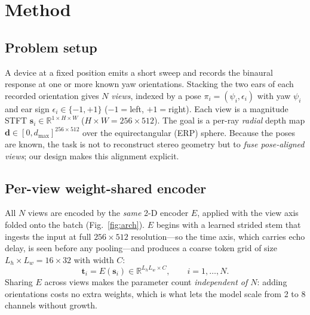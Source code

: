 \section{Method}
\label{sec:method}

\subsection{Problem setup}
A device at a fixed position emits a short sweep and records the binaural response at
one or more known yaw orientations. Stacking the two ears of each recorded
orientation gives $N$ \emph{views}, indexed by a pose
$\pi_i=(\psi_i,\epsilon_i)$ with yaw $\psi_i$ and ear sign $\epsilon_i\!\in\!\{-1,+1\}$
($-1{=}$left, $+1{=}$right). Each view is a magnitude STFT
$\mathbf{s}_i\!\in\!\mathbb{R}^{1\times H\times W}$ ($H{\times}W{=}256{\times}512$).
The goal is a per-ray \emph{radial} depth map
$\mathbf{d}\!\in\![0,d_{\max}]^{256\times512}$ over the equirectangular (ERP) sphere.
Because the poses are known, the task is not to reconstruct stereo geometry but to
\emph{fuse pose-aligned views}; our design makes this alignment explicit.

\subsection{Per-view weight-shared encoder}
All $N$ views are encoded by the \emph{same} 2-D encoder $E$, applied with the view
axis folded onto the batch (Fig.~\ref{fig:arch}). $E$ begins with a learned strided
stem that ingests the input at full $256\times512$ resolution---so the time axis,
which carries echo delay, is seen before any pooling---and produces a coarse token
grid of size $L_h\times L_w=16\times32$ with width $C$:
\begin{equation}
\mathbf{t}_i = E(\mathbf{s}_i)\in\mathbb{R}^{L_hL_w\times C},\qquad i=1,\dots,N .
\end{equation}
Sharing $E$ across views makes the parameter count \emph{independent of $N$}: adding
orientations costs no extra weights, which is what lets the model scale from 2 to 8
channels without growth.

